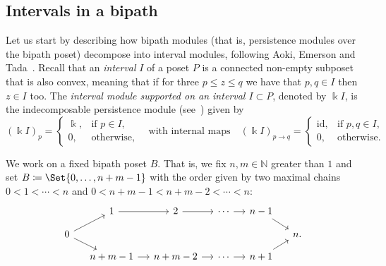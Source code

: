 \documentclass[a4paper,english,reqno]{amsart}
\newcommand{\deff}{\textit}
\renewcommand\k{\Bbbk}
\newcommand{\Id}{\mathrm{id}}
\newcommand\N{\mathbb{N}}
\theoremstyle{plain}
\theoremstyle{definition} %
\begin{document}
\subsection{Intervals in a bipath} Let us start by describing how bipath modules (that is, persistence modules over the bipath poset) decompose into interval modules, following Aoki, Emerson and Tada~\cite{aokiBipathPersistence2024}. Recall that an \deff{interval} $I$ of a poset $P$ is a connected non-empty subposet that is also convex, meaning that if for three $p\leq z \leq q$ we have that $p,q\in I$ then $z\in I$ too. The \deff{interval module supported on an interval $I\subset P$}, denoted by $\k I$, is the indecomposable persistence module (see~\cite[Proposition 2.2]{botnanAlgebraicStabilityZigzag2018}) given by
\begin{equation*}
  (\k I)_{p} =
  \begin{cases}
    \k, & \text{if $p\in I$,}\\
    0, & \text{otherwise,}
  \end{cases}
  \quad\text{with internal maps}\quad
  (\k I)_{p\to q} =
  \begin{cases}
    \Id, & \text{if $p,q\in I$,}\\
    0, & \text{otherwise.}
  \end{cases}
\end{equation*}

We work on a fixed bipath poset $B$. That is, we fix $n, m\in\N$ greater than $1$ and set $B \coloneqq \Set{0, \dots, n + m - 1}$ with the order given by two maximal chains $0 < 1 < \cdots < n$ and $0 < n + m - 1 < n + m - 2 < \cdots < n$:
\[
  \begin{tikzcd}[ampersand replacement=\&, column sep=small, row sep=small]
	\& 1 \& 2 \& \cdots \& n - 1 \\
	0 \&\&\&\&\& n. \\
	\& {n + m - 1} \& {n + m - 2} \& \cdots \& {n + 1}
	\arrow[from=1-2, to=1-3]
	\arrow[from=1-3, to=1-4]
	\arrow[from=1-4, to=1-5]
	\arrow[from=1-5, to=2-6]
	\arrow[from=2-1, to=1-2]
	\arrow[from=2-1, to=3-2]
	\arrow[from=3-2, to=3-3]
	\arrow[from=3-3, to=3-4]
	\arrow[from=3-4, to=3-5]
	\arrow[from=3-5, to=2-6]
\end{tikzcd}
\]
\end{document}
